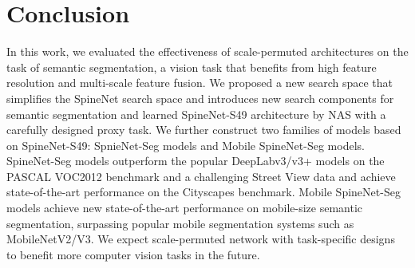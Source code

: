 \documentclass[10pt,twocolumn,letterpaper]{article}
\begin{document}
\section{Conclusion}\label{sec:conclusion}
In this work, we evaluated the effectiveness of scale-permuted architectures on the task of semantic segmentation, a vision task that benefits from high feature resolution and multi-scale feature fusion. We proposed a new search space that simplifies the SpineNet search space and introduces new search components for semantic segmentation and learned SpineNet-S49 architecture by NAS with a carefully designed proxy task. We further construct two families of models based on SpineNet-S49: SpnieNet-Seg models and Mobile SpineNet-Seg models. SpineNet-Seg models outperform the popular DeepLabv3/v3+ models on the PASCAL VOC2012 benchmark and a challenging Street View data and achieve state-of-the-art performance on the Cityscapes benchmark. Mobile SpineNet-Seg models achieve new state-of-the-art performance on mobile-size semantic segmentation, surpassing popular mobile segmentation systems such as MobileNetV2/V3. We expect scale-permuted network with task-specific designs to benefit more computer vision tasks in the future.


\clearpage

{\small


}
\end{document}
